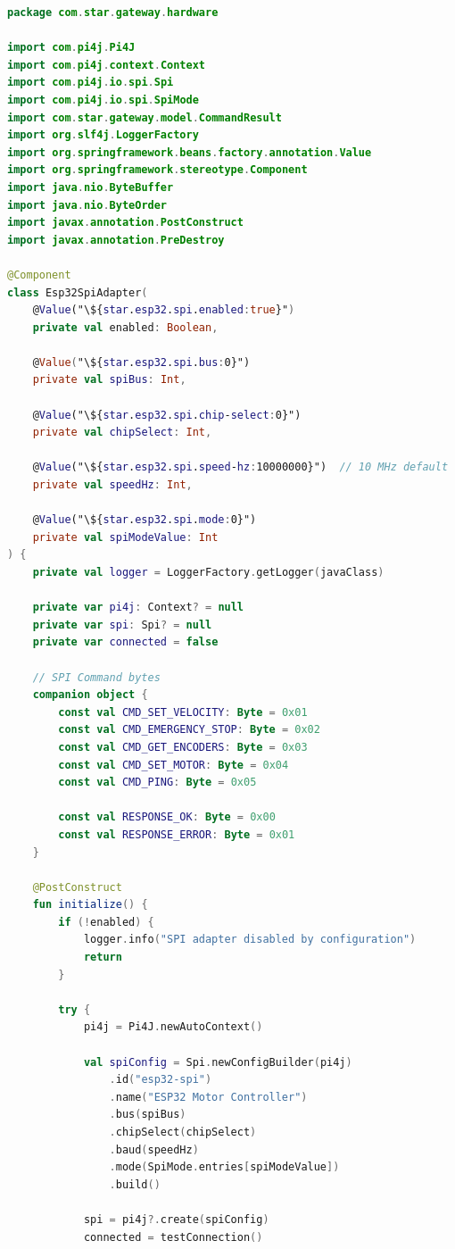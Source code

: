 \documentclass[11pt,letterpaper]{article}
\begin{document}
\begin{lstlisting}[language=Kotlin, caption=Esp32SpiAdapter.kt]
package com.star.gateway.hardware

import com.pi4j.Pi4J
import com.pi4j.context.Context
import com.pi4j.io.spi.Spi
import com.pi4j.io.spi.SpiMode
import com.star.gateway.model.CommandResult
import org.slf4j.LoggerFactory
import org.springframework.beans.factory.annotation.Value
import org.springframework.stereotype.Component
import java.nio.ByteBuffer
import java.nio.ByteOrder
import javax.annotation.PostConstruct
import javax.annotation.PreDestroy

@Component
class Esp32SpiAdapter(
    @Value("\${star.esp32.spi.enabled:true}")
    private val enabled: Boolean,

    @Value("\${star.esp32.spi.bus:0}")
    private val spiBus: Int,

    @Value("\${star.esp32.spi.chip-select:0}")
    private val chipSelect: Int,

    @Value("\${star.esp32.spi.speed-hz:10000000}")  // 10 MHz default
    private val speedHz: Int,

    @Value("\${star.esp32.spi.mode:0}")
    private val spiModeValue: Int
) {
    private val logger = LoggerFactory.getLogger(javaClass)

    private var pi4j: Context? = null
    private var spi: Spi? = null
    private var connected = false

    // SPI Command bytes
    companion object {
        const val CMD_SET_VELOCITY: Byte = 0x01
        const val CMD_EMERGENCY_STOP: Byte = 0x02
        const val CMD_GET_ENCODERS: Byte = 0x03
        const val CMD_SET_MOTOR: Byte = 0x04
        const val CMD_PING: Byte = 0x05

        const val RESPONSE_OK: Byte = 0x00
        const val RESPONSE_ERROR: Byte = 0x01
    }

    @PostConstruct
    fun initialize() {
        if (!enabled) {
            logger.info("SPI adapter disabled by configuration")
            return
        }

        try {
            pi4j = Pi4J.newAutoContext()

            val spiConfig = Spi.newConfigBuilder(pi4j)
                .id("esp32-spi")
                .name("ESP32 Motor Controller")
                .bus(spiBus)
                .chipSelect(chipSelect)
                .baud(speedHz)
                .mode(SpiMode.entries[spiModeValue])
                .build()

            spi = pi4j?.create(spiConfig)
            connected = testConnection()


\end{lstlisting}
\end{document}
